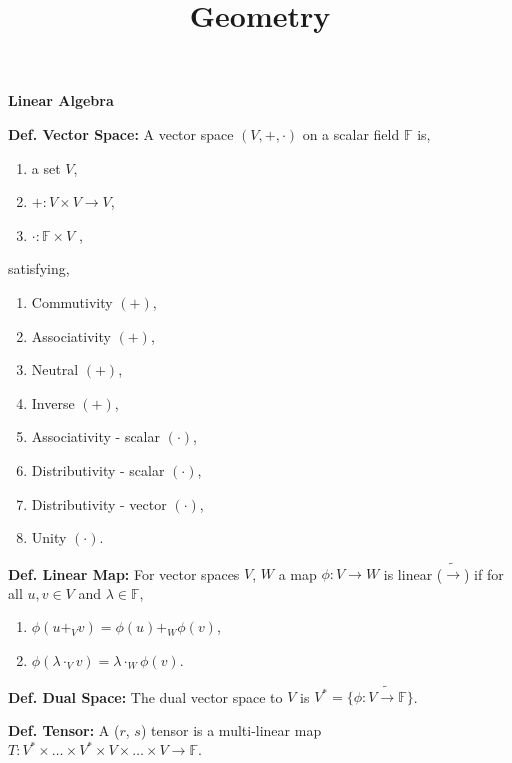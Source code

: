 \documentclass[12pt]{article}
\title{\vspace{-2em}Geometry}
\date{}
\begin{document}
\maketitle

\vspace{-4em}
\begin{multicols}{2}

  \begin{center}
    \textbf{Linear Algebra}
  \end{center}
  
  \noindent
  \textbf{Def. Vector Space:} A vector space $(V, +, \cdot)$ on a scalar field $\mathbb{F}$ is,
  \begin{enumerate}
  \item a set $V$,
  \item $+ : V \times V \rightarrow V$,
  \item $\cdot : \mathbb{F} \times V$ ,
  \end{enumerate}
  satisfying,
  \begin{enumerate}
  \item Commutivity $(+)$,
  \item Associativity $(+)$,
  \item Neutral $(+)$,
  \item Inverse $(+)$,
  \item Associativity - scalar $(\cdot)$,
  \item Distributivity - scalar $(\cdot)$,
  \item Distributivity - vector $(\cdot)$,
  \item Unity $(\cdot)$.
  \end{enumerate}
  
  \noindent
  \textbf{Def. Linear Map:} For vector spaces $V$, $W$ a map $\phi: V \rightarrow W$ is linear ($\tilde{\rightarrow}$) if
  for all $u, v \in V$ and $\lambda \in \mathbb{F}$,
  \begin{enumerate}
  \item $\phi(u +_V v) = \phi(u) +_W \phi(v)$,
  \item $\phi(\lambda \cdot_V v) = \lambda \cdot_W \phi(v)$.
  \end{enumerate}
  
  \noindent
  \textbf{Def. Dual Space:} The dual vector space to $V$ is $V^{*} = \{\phi: V \tilde{\rightarrow} \mathbb{F}\}$.
  
  \noindent
  \textbf{Def. Tensor:} A ($r$, $s$) tensor is a multi-linear
  map $T: V^{*} \times \dots \times V^{*} \times V \times \dots \times V \rightarrow \mathbb{F}$.


\end{multicols}
\end{document}
